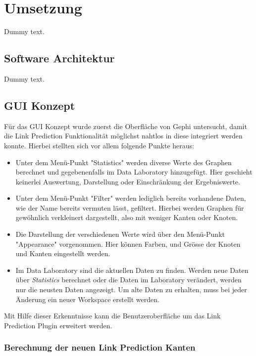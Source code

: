 \chapter{Umsetzung}

Dummy text.

\section{Software Architektur}

Dummy text.

\section{GUI Konzept}

Für das GUI Konzept wurde zuerst die Oberfläche von Gephi untersucht, damit die Link Prediction Funktionalität möglichst
nahtlos in diese integriert werden konnte. Hierbei stellten sich vor allem folgende Punkte heraus:

\begin{itemize}
    \item Unter dem Menü-Punkt "Statistics" werden diverse Werte des Graphen berechnet und gegebenenfalls im Data Laboratory
          hinzugefügt. Hier geschieht keinerlei Auswertung, Darstellung oder Einschränkung der Ergebniswerte.
    \item Unter dem Menü-Punkt "Filter" werden lediglich bereits vorhandene Daten, wie der Name bereits vermuten lässt,
          gefiltert. Hierbei werden Graphen für gewöhnlich verkleinert dargestellt, also mit weniger Kanten oder Knoten.
    \item Die Darstellung der verschiedenen Werte wird über den Menü-Punkt "Appearance" vorgenommen. Hier können Farben,
          und Grösse der Knoten und Kanten eingestellt werden.
    \item Im Data Laboratory sind die aktuellen Daten zu finden. Werden neue Daten über \textit{Statistics} berechnet
          oder die Daten im Laboratory verändert, werden nur die neusten Daten angezeigt. Um alte Daten zu erhalten,
          muss bei jeder Änderung ein neuer Workspace erstellt werden.
\end{itemize}

Mit Hilfe dieser Erkenntnisse kann die Benutzeroberfläche um das Link Prediction Plugin erweitert werden.

\subsection{Berechnung der neuen Link Prediction Kanten}


